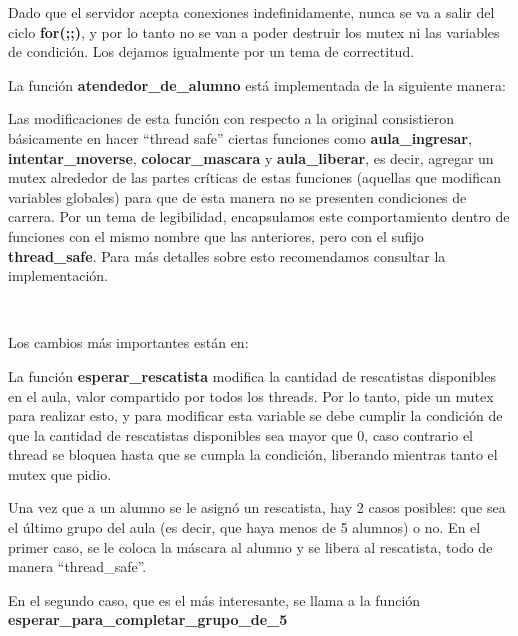 Dado que el servidor acepta conexiones indefinidamente, nunca se va a salir del ciclo \textbf{for(;;)}, y por lo tanto no se van a poder destruir los mutex ni las variables de condici\'on. Los dejamos igualmente por un tema de correctitud.

\newpage
La funci\'on \textbf{atendedor\_de\_alumno} est\'a implementada de la siguiente manera: 




Las modificaciones de esta funci\'on con respecto a la original consistieron b\'asicamente en hacer ``thread safe'' ciertas funciones como \textbf{aula\_ingresar}, \textbf{intentar\_moverse}, \textbf{colocar\_mascara} y \textbf{aula\_liberar}, es decir, agregar un mutex alrededor de las 
partes cr\'iticas de estas funciones (aquellas que modifican variables globales) para que de esta manera no se presenten condiciones de carrera. Por un tema de legibilidad, encapsulamos este comportamiento dentro de funciones con el mismo nombre que las anteriores, pero
con el sufijo \textbf{thread\_safe}. Para m\'as detalles sobre esto recomendamos consultar la implementaci\'on.

~\\
\newline

Los cambios m\'as importantes est\'an en: 




La funci\'on \textbf{esperar\_rescatista} modifica la cantidad de rescatistas disponibles en el aula, valor compartido por todos los threads. Por lo tanto, pide un mutex para realizar esto, y para modificar esta variable se debe cumplir la condici\'on de que 
la cantidad de rescatistas disponibles sea mayor que $0$, caso contrario el thread se bloquea hasta que se cumpla la condici\'on, liberando mientras tanto el mutex que pidio.




Una vez que a un alumno se le asign\'o un rescatista, hay 2 casos posibles: que sea el \'ultimo grupo del aula (es decir, que haya menos de 5 alumnos) o no. En el primer caso, se
le coloca la m\'ascara al alumno y se libera al rescatista, todo de manera ``thread\_safe''.

En el segundo caso, que es el m\'as interesante, se llama a la funci\'on \textbf{esperar\_para\_completar\_grupo\_de\_5}


